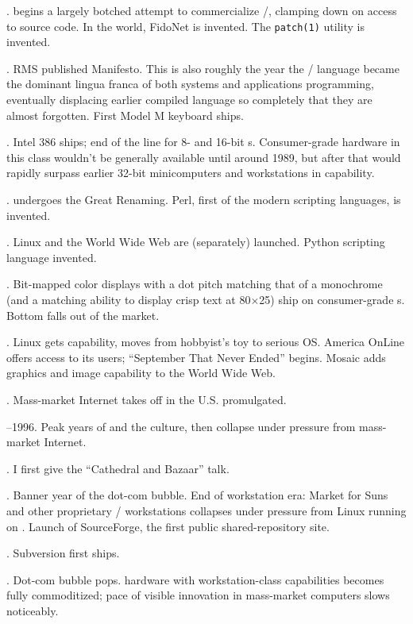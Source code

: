 .
 begins a largely botched attempt to commercialize \UNIX/, clamping down on
access to source code. In the  world, FidoNet is invented. The {\tt patch(1)}
utility is invented.

.
RMS published  Manifesto. This is also roughly the year the \CEE/ language
became the dominant lingua franca of both systems and applications programming,
eventually displacing earlier compiled language so completely that they are
almost forgotten. First Model M keyboard ships.

.
Intel 386 ships; end of the line for 8- and 16-bit s. Consumer-grade hardware
in this class wouldn't be generally available until around 1989, but after that
would rapidly surpass earlier 32-bit minicomputers and workstations in
capability.

.
 undergoes the Great Renaming. Perl, first of the modern scripting
languages, is invented.

.
Linux and the World Wide Web are (separately) launched. Python scripting
language invented.

.
Bit-mapped color displays with a dot pitch matching that of a monochrome 
(and a matching ability to display crisp text at 80$\times$25) ship on consumer-grade
s. Bottom falls out of the  market.

.
Linux gets  capability, moves from hobbyist's toy to serious OS. America
OnLine offers  access to its users; ``September That Never Ended'' begins.
Mosaic adds graphics and image capability to the World Wide Web.

.
Mass-market Internet takes off in the U.S\hbox{}.  promulgated.

--1996.
Peak years of  and the  culture, then collapse under pressure
from mass-market Internet.

.
I first give the ``Cathedral and Bazaar'' talk.

.
Banner year of the dot-com bubble. End of workstation era: Market for Suns and
other proprietary \UNIX/ workstations collapses under pressure from Linux running
on . Launch of SourceForge, the first public shared-repository site.

.
Subversion first ships.

.
Dot-com bubble pops.  hardware with workstation-class capabilities becomes
fully commoditized; pace of visible innovation in mass-market computers slows
noticeably.

